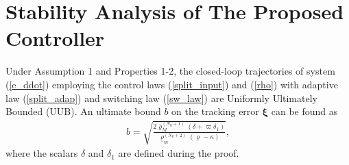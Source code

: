 \section{Stability Analysis of The Proposed Controller}
\begin{theorem}
	Under Assumption 1 and Properties 1-2, the closed-loop trajectories of system (\ref{e_ddot}) employing the control laws (\ref{split_input}) and (\ref{rho}) with adaptive law (\ref{split_adap}) and switching law (\ref{sw_law}) are Uniformly Ultimately Bounded (UUB). An ultimate bound $b$ on the tracking error $\boldsymbol \xi$ can be found as
	\begin{align}
	b = \sqrt{\frac{{2\bar{\varrho}_M^{(N_0+1)}} \left( \delta + \varpi \delta_1 \right ) }{ {{\underline{\varrho}_m^{(N_0+2)}\left( \varrho - \kappa \right)}} }}, \label{bound} 
	\end{align}
	where the scalars $\delta$ and $\delta_1$ are defined during the proof.
\end{theorem}
